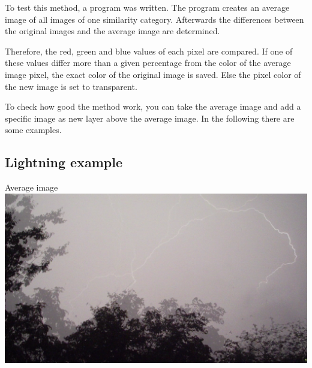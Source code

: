 \documentclass[10pt,a4paper,parskip=full]{scrartcl}
\begin{document}
	To test this method, a program was written. The program creates an average image of all images of one similarity category. Afterwards the differences between the original images and the average image are determined.
	
	Therefore, the red, green and blue values of each pixel are compared. If one of these values differ more than a given percentage from the color of the average image pixel, the exact color of the original image is saved. Else the pixel color of the new image is set to transparent.
	
	To check how good the method work, you can take the average image and add a specific image as new layer above the average image. In the following there are some examples.
	\newpage
	
	\subsection{Lightning example}
	\centering Average image\\
	\includegraphics[width=\linewidth]{lightning_average}
	\newpage
\end{document}
